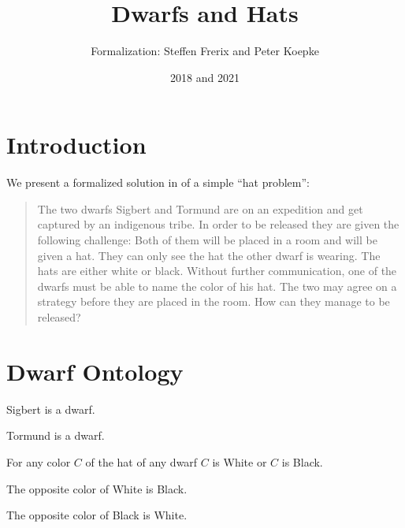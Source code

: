 \documentclass{article}
\title{Dwarfs and Hats}
\author{\Naproche Formalization: Steffen Frerix and Peter Koepke}
\date{2018 and 2021}
\begin{document}
\maketitle

\begin{forthel}
\end{forthel}


\section{Introduction}

We present a formalized solution in \Naproche of a simple ``hat problem'':

\begin{quotation}
  \noindent The two dwarfs Sigbert and Tormund are on an expedition and get captured by an indigenous tribe.
  In order to be released they are given the following challenge:
  Both of them will be placed in a room and will be given a hat.
  They can only see the hat the other dwarf is wearing.
  The hats are either white or black.
  Without further communication, one of the dwarfs must be able to name the color of his hat.
  The two may agree on a strategy before they are placed in the room.
  How can they manage to be released?
\end{quotation}


\section{Dwarf Ontology}

\begin{forthel}
  \begin{signature}
    Sigbert is a dwarf.
  \end{signature}
  \begin{signature}
    Tormund is a dwarf.
  \end{signature}
  \begin{axiom}
    For any color $C$ of the hat of any dwarf $C$ is White or $C$ is Black.
  \end{axiom}
  \begin{axiom}
    The opposite color of White is Black.
  \end{axiom}
  \begin{axiom}
    The opposite color of Black is White.
  \end{axiom}
\end{forthel}
\end{document}
